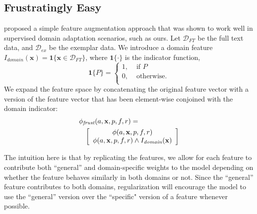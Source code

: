 \documentclass[11pt,a4paper]{article}
\newcommand{\indicator}[1]{\boldsymbol{1}\{#1\}}
\begin{document}
\subsection{Frustratingly Easy}
\label{sec:frust}
\cite{daume-2009} proposed a simple feature augmentation approach that was shown to work well in supervised domain adaptation scenarios, 
such as ours.
Let $\mathcal{D}_{FT}$ be the full text data, and $\mathcal{D}_{ex}$ be the exemplar data.
We %
introduce a domain feature $I_{\textit{domain}}(\mathbf{x}) = \indicator{\mathbf{x} \in \mathcal{D}_{FT}}$,
where $\indicator{\cdot}$ is the indicator function, \[
\indicator{P} = \left\{\begin{array}{lr}
1, & \text{ if } P \\
0, & \text{ otherwise}. \\
\end{array}
\right.
\]
We expand the feature space by concatenating the original feature vector with a version of the feature vector that has been element-wise conjoined with the domain indicator:
\begin{equation}
\begin{align*}
\lefteqn{
\phi_{\textit{frust}}(a, \mathbf{x}, p, f, r) =
} \\
&&
\left[\begin{array}{c}
\phi(a, \mathbf{x}, p, f, r) \\
\phi(a, \mathbf{x}, p, f, r) \wedge I_{\textit{domain}}(\mathbf{x})
\end{array}
\right]
\end{align*}
\end{equation}


The intuition here is that by replicating the features, we allow for
each feature to contribute both ``general'' and domain-specific weights to the model depending on whether the feature
behaves similarly in both domains or not.
Since the ``general'' feature contributes to both domains, regularization will encourage the model to use the ``general'' version over the ``specific" version of a feature whenever possible.
\end{document}
